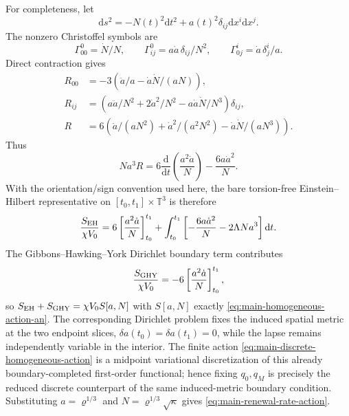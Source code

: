 \documentclass[11pt]{article}
\numberwithin{equation}{section}
\theoremstyle{definition}
\theoremstyle{remark}
\newcommand{\dd}{\mathrm d}
\begin{document}
For completeness, let
\[
 \dd s^2=-N(t)^2\dd t^2+a(t)^2\delta_{ij}\dd x^i\dd x^j.
\]
The nonzero Christoffel symbols are
\[
 \Gamma^0_{00}=\dot N/N,\qquad
 \Gamma^0_{ij}=a\dot a\,\delta_{ij}/N^2,\qquad
 \Gamma^i_{0j}=\dot a\,\delta^i_j/a.
\]
Direct contraction gives
\begin{align}
 R_{00}&=-3\left(\ddot a/a-\dot a\dot N/(aN)\right),\\
 R_{ij}&=\left(a\ddot a/N^2+2\dot a^2/N^2
              -a\dot a\dot N/N^3\right)\delta_{ij},\\
 R&=6\left(\ddot a/(aN^2)+\dot a^2/(a^2N^2)
              -\dot a\dot N/(aN^3)\right).
 \label{eq:supp-homogeneous-curvature}
\end{align}
Thus
\begin{equation}
 Na^3R=6\frac{\dd}{\dd t}\left(\frac{a^2\dot a}{N}\right)
       -\frac{6a\dot a^2}{N}.
 \label{eq:supp-homogeneous-total-derivative}
\end{equation}
With the orientation/sign convention used here, the bare torsion-free
Einstein--Hilbert representative on $[t_0,t_1]\times\mathbb T^3$ is therefore
\begin{equation}
 \frac{S_{\rm EH}}{\chi V_0}
 =6\left[\frac{a^2\dot a}{N}\right]_{t_0}^{t_1}
 +\int_{t_0}^{t_1}\left[-\frac{6a\dot a^2}{N}
                         -2\Lambda Na^3\right]\dd t.
 \label{eq:supp-homogeneous-eh-split}
\end{equation}
The Gibbons--Hawking--York Dirichlet boundary term
\cite{York1972,GibbonsHawking1977} contributes
\begin{equation}
 \frac{S_{\rm GHY}}{\chi V_0}
 =-6\left[\frac{a^2\dot a}{N}\right]_{t_0}^{t_1},
 \label{eq:supp-homogeneous-ghy}
\end{equation}
so $S_{\rm EH}+S_{\rm GHY}=\chi V_0S[a,N]$ with $S[a,N]$ exactly
\eqref{eq:main-homogeneous-action-an}.  The corresponding Dirichlet problem
fixes the induced spatial metric at the two endpoint slices,
$\delta a(t_0)=\delta a(t_1)=0$, while the lapse remains independently variable
in the interior.  The finite action \eqref{eq:main-discrete-homogeneous-action}
is a midpoint variational discretization of this already boundary-completed
first-order functional; hence fixing $q_0,q_M$ is precisely the reduced discrete
counterpart of the same induced-metric boundary condition.  Substituting
$a=\varrho^{1/3}$ and $N=\varrho^{1/3}\sqrt\kappa$ gives
\eqref{eq:main-renewal-rate-action}.
\end{document}
